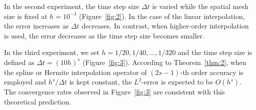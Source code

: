\documentclass[10pt,a4paper,tbtags,leqno]{amsart}
\theoremstyle{definition}
\numberwithin{equation}{section}
\begin{document}
In the second experiment, the time step size $\Delta t$ is varied while the spatial mesh size is fixed at $h = 10^{-3}$ (Figure~\ref{fig:2}). In the case of the linear interpolation, the error increases as $ \Delta t $ decreases. In contrast, when higher-order interpolation is used, the error decreases as the time step size becomes smaller. 

In the third experiment, we set $ h = 1 / 20, 1 / 40, \ldots, 1 / 320 $ and the time step size is defined as $\Delta t = (10h)^s$ (Figure~\ref{fig:3}). According to Theorem~\ref{thm:2}, when the spline or Hermite interpolation operator of $ (2 s - 1) $-th order accuracy is employed and $ h^s / \Delta t $ is kept constant, the $ L^2 $-error is expected to be $ O(h^s) $. The convergence rates observed in Figure~\ref{fig:3} are consistent with this theoretical prediction. 
\end{document}

